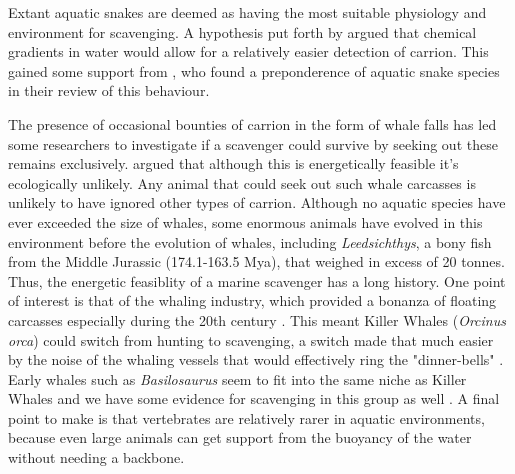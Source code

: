 \documentclass[a4paper,12pt]{article}
\begin{document}
Extant aquatic snakes are deemed as having the most suitable physiology and environment for scavenging. A hypothesis put forth by \cite{sazima1990necrofagia} argued that chemical gradients in water would allow for a relatively easier detection of carrion. This gained some support from \cite{devault2002scavenging}, who found a preponderence of aquatic snake species in their review of this behaviour. 

The presence of occasional bounties of carrion in the form of whale falls has led some researchers to investigate if a scavenger could survive by seeking out these remains exclusively. \cite{ruxton2005searching} argued that although this is energetically feasible it's ecologically unlikely. Any animal that could seek out such whale carcasses is unlikely to have ignored other types of carrion. Although no aquatic species have ever exceeded the size of whales, some enormous animals have evolved in this environment before the evolution of whales, including \textit{Leedsichthys}, a bony fish from the Middle Jurassic (174.1-163.5 Mya), that weighed in excess of 20 tonnes. Thus, the energetic feasiblity of a marine scavenger has a long history. One point of interest is that of the whaling industry, which provided a bonanza of floating carcasses especially during the 20th century \citep{Whitehead415}. This meant Killer Whales (\textit{Orcinus orca}) could switch from hunting to scavenging, a switch made that much easier by the noise of the whaling vessels that would effectively ring the "dinner-bells" \citep{Whitehead415}. Early whales such as \textit{Basilosaurus} seem to fit into the same niche as Killer Whales and we have some evidence for scavenging in this group as well \citep{fahlke2012bite}. A final point to make is that vertebrates are relatively rarer in aquatic environments, because even large animals can get support from the buoyancy of the water without needing a backbone.
\end{document}
